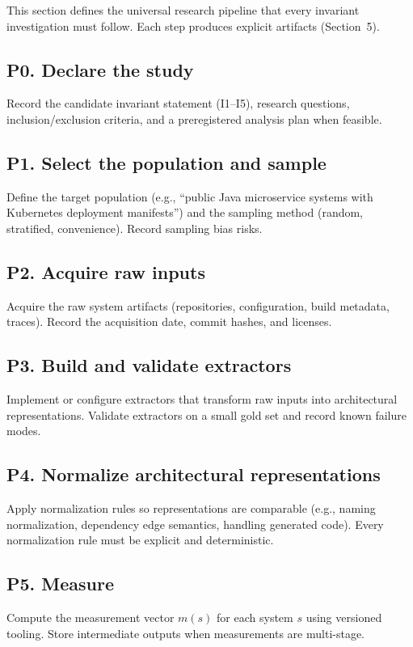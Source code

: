 This section defines the universal research pipeline that every invariant investigation must follow. Each step produces explicit artifacts (Section~5).

\subsection*{P0. Declare the study}
Record the candidate invariant statement (I1--I5), research questions, inclusion/exclusion criteria, and a preregistered analysis plan when feasible.

\subsection*{P1. Select the population and sample}
Define the target population (e.g., ``public Java microservice systems with Kubernetes deployment manifests'') and the sampling method (random, stratified, convenience). Record sampling bias risks.

\subsection*{P2. Acquire raw inputs}
Acquire the raw system artifacts (repositories, configuration, build metadata, traces). Record the acquisition date, commit hashes, and licenses.

\subsection*{P3. Build and validate extractors}
Implement or configure extractors that transform raw inputs into architectural representations. Validate extractors on a small gold set and record known failure modes.

\subsection*{P4. Normalize architectural representations}
Apply normalization rules so representations are comparable (e.g., naming normalization, dependency edge semantics, handling generated code). Every normalization rule must be explicit and deterministic.

\subsection*{P5. Measure}
Compute the measurement vector $m(s)$ for each system $s$ using versioned tooling. Store intermediate outputs when measurements are multi-stage.

